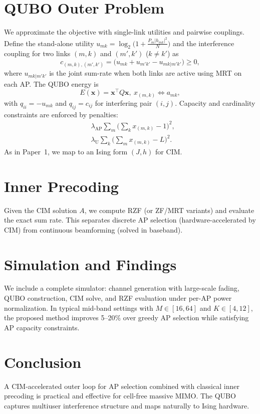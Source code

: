 \documentclass[10pt,conference]{IEEEtran}
\newcommand{\1}{\mathbf{1}}
\begin{document}
\section{QUBO Outer Problem}
We approximate the objective with single-link utilities and pairwise couplings.
Define the stand-alone utility $u_{mk}=\log_2\!\big(1+\frac{P_m|h_{mk}|^2}{N}\big)$ and the interference coupling
for two links $(m,k)$ and $(m',k')$ ($k\neq k'$) as
\begin{equation}
c_{(m,k),(m',k')} = \big(u_{mk}+u_{m'k'} - u_{mk|m'k'}\big)\ge 0,
\end{equation}
where $u_{mk|m'k'}$ is the joint sum-rate when both links are active using MRT on each AP.
The QUBO energy is
\begin{equation}
E(\bm{x})=\bm{x}^\top Q\bm{x}, ~ x_{(m,k)}\Leftrightarrow a_{mk},
\end{equation}
with $q_{ii}=-u_{mk}$ and $q_{ij}=c_{ij}$ for interfering pair $(i,j)$.
Capacity and cardinality constraints are enforced by penalties:
\begin{align}
&\lambda_{\text{AP}}\sum_{m}\Big(\sum_{k}x_{(m,k)}-1\Big)^2,\\
&\lambda_{\text{U}}\sum_{k}\Big(\sum_{m}x_{(m,k)}-L\Big)^2.
\end{align}
As in Paper~1, we map to an Ising form $(J,h)$ for CIM.

\section{Inner Precoding}
Given the CIM solution $A$, we compute RZF (or ZF/MRT variants) and evaluate the exact sum rate.
This separates discrete AP selection (hardware-accelerated by CIM) from continuous beamforming (solved in baseband).

\section{Simulation and Findings}
We include a complete simulator: channel generation with large-scale fading, QUBO construction, CIM solve,
and RZF evaluation under per-AP power normalization.
In typical mid-band settings with $M\in[16,64]$ and $K\in[4,12]$,
the proposed method improves 5--20\% over greedy AP selection while satisfying AP capacity constraints.

\section{Conclusion}
A CIM-accelerated outer loop for AP selection combined with classical inner precoding is practical and effective for cell-free massive MIMO.
The QUBO captures multiuser interference structure and maps naturally to Ising hardware.
\end{document}
